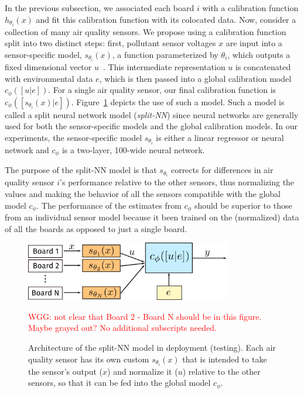 \documentclass[journal abbreviation, manuscript]{copernicus}
\newcommand\todo[1]{\textcolor{red}{#1}}
\begin{document}
In the previous subsection, we associated each board $i$ with a calibration function $h_{\theta_i}(x)$ and fit this calibration function with its colocated data. Now, consider a collection of many air quality sensors. We propose using a calibration function split into two distinct steps: first, pollutant sensor voltages $x$ are input into a sensor-specific model, $s_{\theta_i}(x)$, a function parameterized by $\theta_i$, which outputs a fixed dimensional vector $u$~\citep{Goodfellow-et-al-2016}. This intermediate representation $u$ is concatenated with environmental data $e$, which is then passed into a global calibration model $c_\phi([u | e])$. For a single air quality sensor, our final calibration function is $c_\phi([s_{\theta_i}(x) | e])$.  Figure~\ref{fig:split-nn-deploy} depicts the use of such a model.  Such a model is called a split neural network model (\textit{split-NN}) since neural networks are generally used for both the sensor-specific models and the global calibration models. In our experiments, the sensor-specific model $s_{\theta_i}$ is either a linear regressor or neural network  and $c_\phi$ is a two-layer, 100-wide neural network. 

The purpose of the split-NN model is that $s_{\theta_i}$ corrects for differences in air quality sensor $i$'s performance relative to the other sensors, thus normalizing the values and making the behavior of all the sensors compatible with the global model $c_\phi$.  The performance of the estimates from $c_\phi$ should be superior to those from an individual sensor model because it been trained on the (normalized) data of all the boards as opposed to just a single board.

\begin{figure}
    \includegraphics[width=0.8\textwidth]{writeup/img/split-model.png}
    \caption{Architecture of the split-NN model in deployment (testing).  Each air quality sensor has its own custom $s_{\theta_i}(x)$ that is intended to take the sensor's output ($x$) and normalize it ($u$) relative to the other sensors, so that it can be fed into the global model $c_\phi$.}
    \label{fig:split-nn-deploy}
    \todo{WGG: not clear that Board 2 - Board N should be in this figure.  Maybe grayed out?  No additional subscripts needed.}
\end{figure}
\end{document}
